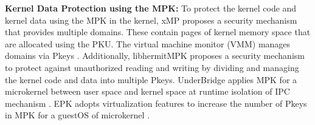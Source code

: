 {\bf Kernel Data Protection using the MPK:}
%
To protect the kernel code and kernel data using the MPK in the kernel, xMP
proposes a security mechanism that provides multiple domains. These contain
pages of kernel memory space that are allocated using the PKU. The virtual
machine monitor (VMM) manages domains via Pkeys \cite{xmp}.
Additionally, libhermitMPK proposes a security mechanism to protect against
unauthorized reading and writing by dividing and managing the kernel code and
data into multiple Pkeys\cite{libhermitmpk}.
%
UnderBridge applies MPK for a microkernel between user space and kernel space at
runtime isolation of IPC mechanism \cite{gu20atc}.
%
EPK adopts virtualization features to increase the number of Pkeys in MPK for a
guestOS of microkernel \cite{gu22atc}.

%



